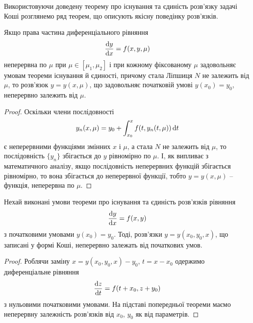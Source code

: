 Використовуючи доведену теорему про існування та єдиність розв’язку задачі Коші розглянемо ряд теорем, що описують якісну поведінку розв’язків.

\begin{theorem}
	Якщо права частина диференціального рівняння
	\begin{equation*}
		\frac{\mathop{}\!\mathrm{d} y}{\mathop{}\!\mathrm{d} x} = f(x, y, \mu)
	\end{equation*}
	неперервна по $\mu$ при $\mu \in [\mu_1, \mu_2]$ і при кожному фіксованому $\mu$ задовольняє умовам теореми існування й єдиності, причому стала Ліпшиця $N$ не залежить від $\mu$, то розв’язок $y = y(x, \mu)$, що задовольняє початковій умові $y(x_0)=y_0$, неперервно залежить від $\mu$.
\end{theorem}
\begin{proof} 
	Оскільки члени послідовності
	\begin{equation*}
		y_n(x, \mu) = y_0 + \int_{x_0}^x f(t, y_n(t, \mu)) \mathop{}\!\mathrm{d} t
	\end{equation*}
	є неперервними функціями змінних $x$ і $\mu$, а стала $N$ не залежить від $\mu$, то послідовність $\{y_n\}$ збігається до $y$ рівномірно по $\mu$. І, як випливає з математичного аналізу, якщо послідовність неперервних функцій збігається рівномірно, то вона збігається до неперервної функції, тобто $y=y(x,\mu)$ -- функція, неперервна по $\mu$.
\end{proof}

\begin{theorem}
	Нехай виконані умови теореми про існування та єдиність розв’язків рівняння
	\begin{equation*}
		\frac{\mathop{}\!\mathrm{d} y}{\mathop{}\!\mathrm{d} x} = f(x,y)
	\end{equation*}
	з початковими умовами $y(x_0) = y_0$. Тоді, розв’язки $y=y(x_0,y_0,x)$, що записані у формі Коші, неперервно залежать від початкових умов. 
\end{theorem}
\begin{proof}
	Роблячи заміну $x = y(x_0, y_0, x) - y_0$, $t = x - x_0$ одержимо диференціальне рівняння  
	\begin{equation*}
		\frac{\mathop{}\!\mathrm{d} z}{\mathop{}\!\mathrm{d} t} = f(t + x_0, z + y_0)
	\end{equation*}
	з нульовими початковими умовами. На підставі попередньої теореми маємо неперервну залежність розв’язків від $x_0$, $y_0$ як від параметрів.
\end{proof}

